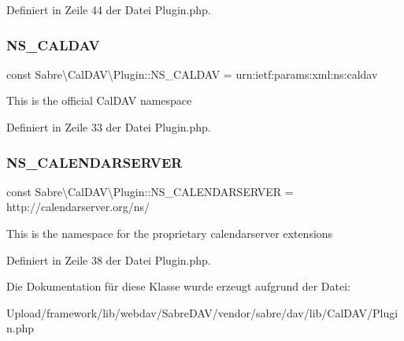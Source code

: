 Definiert in Zeile 44 der Datei Plugin.\+php.

\mbox{\label{class_sabre_1_1_cal_d_a_v_1_1_plugin_a67ed1e766e3346b20c1cb9b576e5a5ad}} 
\subsubsection{\texorpdfstring{N\+S\+\_\+\+C\+A\+L\+D\+AV}{NS\_CALDAV}}
{\footnotesize\ttfamily const Sabre\textbackslash{}\+Cal\+D\+A\+V\textbackslash{}\+Plugin\+::\+N\+S\+\_\+\+C\+A\+L\+D\+AV = \textquotesingle{}urn\+:ietf\+:params\+:xml\+:ns\+:caldav\textquotesingle{}}

This is the official Cal\+D\+AV namespace 

Definiert in Zeile 33 der Datei Plugin.\+php.

\mbox{\label{class_sabre_1_1_cal_d_a_v_1_1_plugin_ab9416b2050283d54cdacfecc7653f907}} 
\subsubsection{\texorpdfstring{N\+S\+\_\+\+C\+A\+L\+E\+N\+D\+A\+R\+S\+E\+R\+V\+ER}{NS\_CALENDARSERVER}}
{\footnotesize\ttfamily const Sabre\textbackslash{}\+Cal\+D\+A\+V\textbackslash{}\+Plugin\+::\+N\+S\+\_\+\+C\+A\+L\+E\+N\+D\+A\+R\+S\+E\+R\+V\+ER = \textquotesingle{}http\+://calendarserver.\+org/ns/\textquotesingle{}}

This is the namespace for the proprietary calendarserver extensions 

Definiert in Zeile 38 der Datei Plugin.\+php.



Die Dokumentation für diese Klasse wurde erzeugt aufgrund der Datei\+:\begin{DoxyCompactItemize}
\item 
Upload/framework/lib/webdav/\+Sabre\+D\+A\+V/vendor/sabre/dav/lib/\+Cal\+D\+A\+V/Plugin.\+php\end{DoxyCompactItemize}
